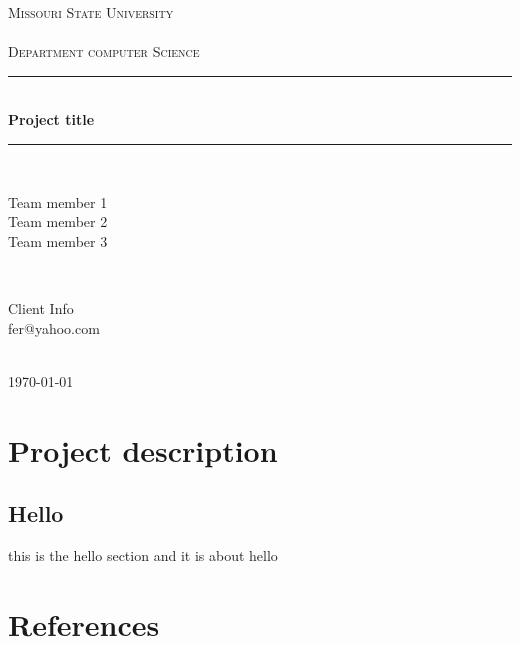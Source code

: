 \documentclass[12pt]{article}
\begin{document}
\begin{titlepage}

\newcommand{\HRule}{\rule{\linewidth}{0.5mm}} 

\center 

\textsc{\LARGE Missouri State University\\~\\Department computer Science}\\[1.0cm] 

\HRule \\[0.4cm]
{ \huge \bfseries Project title}\\[0.4cm] 
\HRule \\[1.5cm]


\begin{minipage}{0.4\textwidth}
\begin{flushleft} \large
Team member 1 \\ Team member 2 \\ Team member 3 
\end{flushleft}
\end{minipage}
~
\begin{minipage}{0.4\textwidth}
\begin{flushright} \large
Client Info \\ 
fer@yahoo.com
\end{flushright}
\end{minipage}\\[2cm]

{\large \today}\\[2cm] 

\end{titlepage}

\newpage
\tableofcontents

\newpage

\section{Project description}
\subsection{Hello}
this is the hello section and it is about hello
\section{References}

\begingroup
\renewcommand{\section}[2]{}
\begin{thebibliography}{10}

\bigskip


\end{thebibliography}
\endgroup
\end{document}
